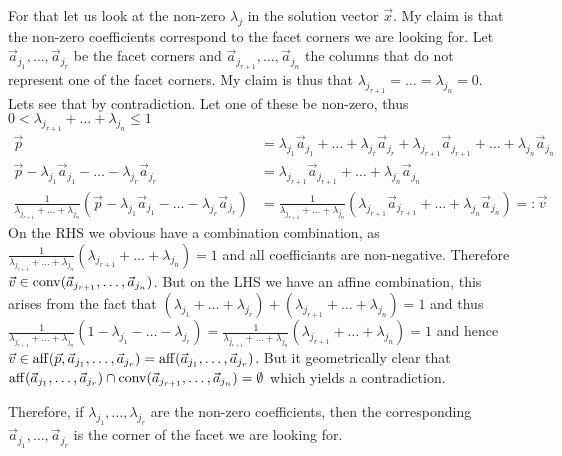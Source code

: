 For that let us look at the non-zero $\lambda_j$ in the solution vector $\vec x$. My claim is that the non-zero coefficients correspond to the facet corners we are looking for. Let $\vec a_{j_1}, \dots, \vec a_{j_r}$ be the facet corners and $\vec a_{j_{r+1}}, \dots, \vec a_{j_n}$ the columns that do not represent one of the facet corners. My claim is thus that $\lambda_{j_{r+1}} = \dots = \lambda_{j_n} = 0$. Lets see that by contradiction. Let one of these be non-zero, thus $0 < \lambda_{j_{r+1}} + \dots + \lambda_{j_n} \leq 1$
\begin{align*}
    \vec p &= \lambda_{j_1}\vec a_{j_1} + \dots + \lambda_{j_r}\vec a_{j_r} + \lambda_{j_{r+1}}\vec a_{j_{r+1}} + \dots + \lambda_{j_n}\vec a_{j_n}\\
    \vec p  - \lambda_{j_1}\vec a_{j_1} - \dots - \lambda_{j_r}\vec a_{j_r} &= \lambda_{j_{r+1}}\vec a_{j_{r+1}} + \dots + \lambda_{j_n}\vec a_{j_n}\\
    \frac{1}{\lambda_{j_{r+1}} + \dots + \lambda_{j_n}}(\vec p  - \lambda_{j_1}\vec a_{j_1} - \dots - \lambda_{j_r}\vec a_{j_r}) &= \frac{1}{\lambda_{j_{r+1}} + \dots + \lambda_{j_n}}(\lambda_{j_{r+1}}\vec a_{j_{r+1}} + \dots + \lambda_{j_n}\vec a_{j_n}) =: \vec v
\end{align*}
On the RHS we obvious have a combination combination, as $\frac{1}{\lambda_{j_{r+1}} + \dots + \lambda_{j_n}}(\lambda_{j_{r+1}} + \dots + \lambda_{j_n}) = 1$ and all coefficiants are non-negative. Therefore $\vec v \in \operatorname{conv}(\vec a_{j_{r+1}}, \dots, \vec a_{j_n})$. But on the LHS we have an affine combination, this arises from the fact that $(\lambda_{j_1} + \dots + \lambda_{j_r}) + (\lambda_{j_{r+1}} + \dots + \lambda_{j_n}) = 1$ and thus $\frac{1}{\lambda_{j_{r+1}} + \dots + \lambda_{j_n}}(1 - \lambda_{j_1} - \dots - \lambda_{j_r}) = \frac{1}{\lambda_{j_{r+1}} + \dots + \lambda_{j_n}}(\lambda_{j_{r+1}} + \dots + \lambda_{j_n}) = 1$ and hence $\vec v \in \operatorname{aff}(\vec p, \vec a_{j_1}, \dots, \vec a_{j_r}) = \operatorname{aff}(\vec a_{j_1}, \dots, \vec a_{j_r})$. But it geometrically clear that $\operatorname{aff}(\vec a_{j_1}, \dots, \vec a_{j_r}) \cap \operatorname{conv}(\vec a_{j_{r+1}}, \dots, \vec a_{j_n}) = \emptyset$ which yields a contradiction.

Therefore, if $\lambda_{j_1}, \dots, \lambda_{j_r}$ are the non-zero coefficients, then the corresponding $\vec a_{j_1}, \dots, \vec a_{j_r}$ is the corner of the facet we are looking for.

